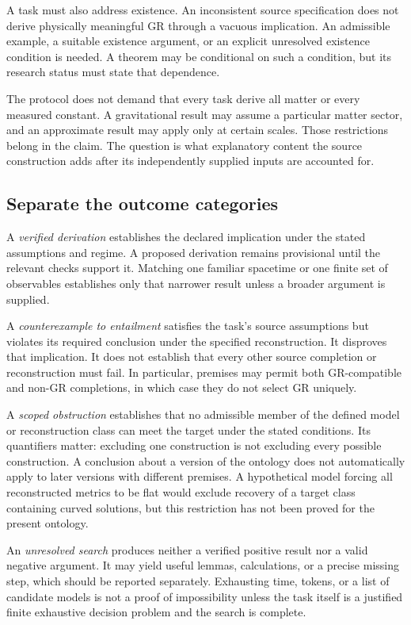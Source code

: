\documentclass[11pt]{article}
\begin{document}
A task must also address existence. An inconsistent source specification does not derive physically meaningful GR through a vacuous implication. An admissible example, a suitable existence argument, or an explicit unresolved existence condition is needed. A theorem may be conditional on such a condition, but its research status must state that dependence.

The protocol does not demand that every task derive all matter or every measured constant. A gravitational result may assume a particular matter sector, and an approximate result may apply only at certain scales. Those restrictions belong in the claim. The question is what explanatory content the source construction adds after its independently supplied inputs are accounted for.

\subsection{Separate the outcome categories}
A \emph{verified derivation} establishes the declared implication under the stated assumptions and regime. A proposed derivation remains provisional until the relevant checks support it. Matching one familiar spacetime or one finite set of observables establishes only that narrower result unless a broader argument is supplied.

A \emph{counterexample to entailment} satisfies the task's source assumptions but violates its required conclusion under the specified reconstruction. It disproves that implication. It does not establish that every other source completion or reconstruction must fail. In particular, premises may permit both GR-compatible and non-GR completions, in which case they do not select GR uniquely.

A \emph{scoped obstruction} establishes that no admissible member of the defined model or reconstruction class can meet the target under the stated conditions. Its quantifiers matter: excluding one construction is not excluding every possible construction. A conclusion about a version of the ontology does not automatically apply to later versions with different premises. A hypothetical model forcing all reconstructed metrics to be flat would exclude recovery of a target class containing curved solutions, but this restriction has not been proved for the present ontology.

An \emph{unresolved search} produces neither a verified positive result nor a valid negative argument. It may yield useful lemmas, calculations, or a precise missing step, which should be reported separately. Exhausting time, tokens, or a list of candidate models is not a proof of impossibility unless the task itself is a justified finite exhaustive decision problem and the search is complete.
\end{document}
